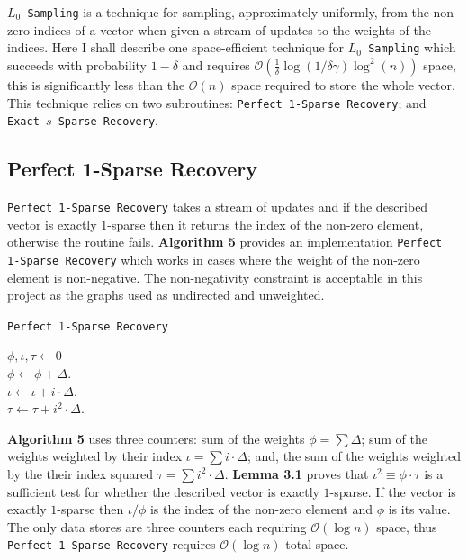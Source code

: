 \documentclass[11pt,twoside,a4paper]{report}
\begin{document}
\par\texttt{$L_0$ Sampling} is a technique for sampling, approximately uniformly, from the non-zero indices of a vector when given a stream of updates to the weights of the indices. Here I shall describe one space-efficient technique for \texttt{$L_0$ Sampling} which succeeds with probability $1-\delta$ and requires $\mathcal{O}\left(\frac1\delta\log(1/\delta\gamma)\log^2(n)\right)$ space, this is significantly less than the $\mathcal{O}(n)$ space required to store the whole vector. This technique relies on two subroutines: \texttt{Perfect 1-Sparse Recovery}; and \texttt{Exact $s$-Sparse Recovery}. %

\subsection{Perfect 1-Sparse Recovery}

\par \texttt{Perfect 1-Sparse Recovery} takes a stream of updates and if the described vector is exactly $1$-sparse then it returns the index of the non-zero element, otherwise the routine fails. \textbf{Algorithm 5} provides an implementation \texttt{Perfect 1-Sparse Recovery} which works in cases where the weight of the non-zero element is non-negative. The non-negativity constraint is acceptable in this project as the graphs used as undirected and unweighted.

\begin{algorithm}
	\caption{\texttt{Perfect $1$-Sparse Recovery}}
	$\phi,\iota,\tau\leftarrow0$\\
	 {
		$\phi\leftarrow\phi+\Delta$.\\
		$\iota\leftarrow\iota+i\cdot\Delta$.\\
		$\tau\leftarrow\tau+i^2\cdot\Delta$.\\
	}
\end{algorithm}

\textbf{Algorithm 5} uses three counters: sum of the weights $\phi=\sum\Delta$; sum of the weights weighted by their index $\iota=\sum i\cdot\Delta$; and, the sum of the weights weighted by the their index squared $\tau=\sum i^2\cdot\Delta$. \textbf{Lemma 3.1} proves that $\iota^2\equiv\phi\cdot\tau$ is a sufficient test for whether the described vector is exactly $1$-sparse. If the vector is exactly $1$-sparse then $\iota/\phi$ is the index of the non-zero element and $\phi$ is its value. The only data stores are three counters each requiring $\mathcal{O}(\log n)$ space, thus \texttt{Perfect 1-Sparse Recovery} requires $\mathcal{O}(\log n)$ total space.
\end{document}
